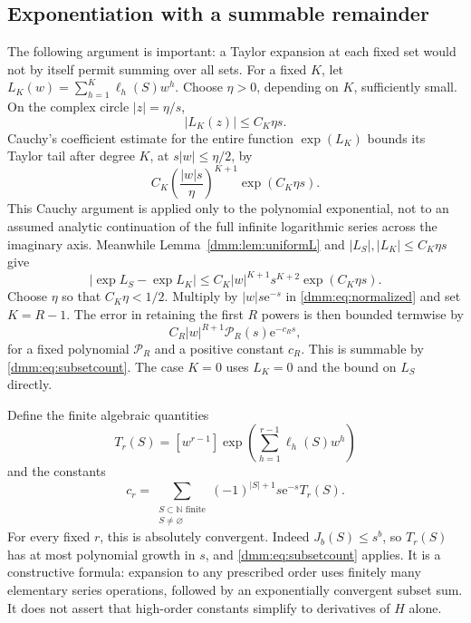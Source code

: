 \documentclass[11pt,letterpaper]{article}
\numberwithin{equation}{section}
\theoremstyle{definition}\newtheorem{definition}[theorem]{Definition}
\theoremstyle{remark}\newtheorem{remark}[theorem]{Remark}
\newcommand{\N}{\mathbb N}
\newcommand{\ee}{\mathrm e}
\begin{document}
\subsection{Exponentiation with a summable remainder}
The following argument is important: a Taylor expansion at each fixed set would not by itself permit summing over all sets. For a fixed $K$, let
$L_K(w)=\sum_{h=1}^{K}\ell_h(S)w^h$. Choose $\eta>0$, depending on $K$, sufficiently small. On the complex circle $|z|=\eta/s$,
\[
|L_K(z)|\le C_K\eta s.
\]
Cauchy's coefficient estimate for the entire function $\exp(L_K)$ bounds its Taylor tail after degree $K$, at $s|w|\le\eta/2$, by
\begin{equation}\label{dmm:eq:expCauchy}
C_K\left(\frac{|w|s}{\eta}\right)^{K+1}\exp(C_K\eta s).
\end{equation}
This Cauchy argument is applied only to the polynomial exponential, not to an assumed analytic continuation of the full infinite logarithmic series across the imaginary axis. Meanwhile Lemma~\ref{dmm:lem:uniformL} and
$|L_S|,|L_K|\le C_K\eta s$ give
\begin{equation}\label{dmm:eq:expdifference}
|\exp L_S-\exp L_K|
\le C_K|w|^{K+1}s^{K+2}\exp(C_K\eta s).
\end{equation}
Choose $\eta$ so that $C_K\eta<1/2$. Multiply by $|w|s\ee^{-s}$ in \eqref{dmm:eq:normalized} and set $K=R-1$. The error in retaining the first $R$ powers is then bounded termwise by
\begin{equation}\label{dmm:eq:summableremainder}
C_R|w|^{R+1}\mathcal P_R(s)\ee^{-c_Rs},
\end{equation}
for a fixed polynomial $\mathcal P_R$ and a positive constant $c_R$. This is summable by \eqref{dmm:eq:subsetcount}. The case $K=0$ uses $L_K=0$ and the bound on $L_S$ directly.

Define the finite algebraic quantities
\begin{equation}\label{dmm:eq:Tr}
T_r(S)=[w^{r-1}]\exp\left(\sum_{h=1}^{r-1}\ell_h(S)w^h\right)
\end{equation}
and the constants
\begin{equation}\label{dmm:eq:cr}
c_r=\sum_{\substack{S\subset\N\text{ finite}\\S\ne\varnothing}}
(-1)^{|S|+1}s\ee^{-s}T_r(S).
\end{equation}
For every fixed $r$, this is absolutely convergent. Indeed $J_b(S)\le s^b$, so $T_r(S)$ has at most polynomial growth in $s$, and \eqref{dmm:eq:subsetcount} applies. It is a constructive formula: expansion to any prescribed order uses finitely many elementary series operations, followed by an exponentially convergent subset sum. It does not assert that high-order constants simplify to derivatives of $H$ alone.
\end{document}
